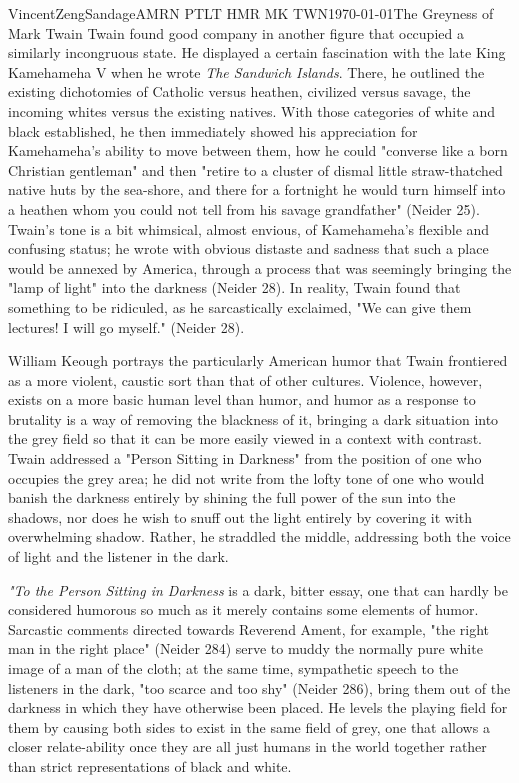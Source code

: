 \documentclass{article}[12pt]
\begin{document}
\begin{mla}{Vincent}{Zeng}{Sandage}{AMRN PTLT HMR MK TWN}{\today}{The Greyness of Mark Twain}
Twain found good company in another figure that occupied a similarly incongruous state. He displayed a certain fascination with the late King Kamehameha V when he wrote \textit{The Sandwich Islands}. There, he outlined the existing dichotomies of Catholic versus heathen, civilized versus savage, the incoming whites versus the existing natives. With those categories of white and black established, he then immediately showed his appreciation for Kamehameha's ability to move between them, how he could "converse like a born Christian gentleman" and then "retire to a cluster of dismal little straw-thatched native huts by the sea-shore, and there for a fortnight he would turn himself into a heathen whom you could not tell from his savage grandfather" (Neider 25). Twain's tone is a bit whimsical, almost envious, of Kamehameha's flexible and confusing status; he wrote with obvious distaste and sadness that such a place would be annexed by America, through a process that was seemingly bringing the "lamp of light" into the darkness (Neider 28). In reality, Twain found that something to be ridiculed, as he sarcastically exclaimed, "We can give them lectures! I will go myself." (Neider 28).

William Keough portrays the particularly American humor that Twain frontiered as a more violent, caustic sort than that of other cultures. Violence, however, exists on a more basic human level than humor, and humor as a response to brutality is a way of removing the blackness of it, bringing a dark situation into the grey field so that it can be more easily viewed in a context with contrast. Twain addressed a "Person Sitting in Darkness" from the position of one who occupies the grey area; he did not write from the lofty tone of one who would banish the darkness entirely by shining the full power of the sun into the shadows, nor does he wish to snuff out the light entirely by covering it with overwhelming shadow. Rather, he straddled the middle, addressing both the voice of light and the listener in the dark.

\textit{"To the Person Sitting in Darkness} is a dark, bitter essay, one that can hardly be considered humorous so much as it merely contains some elements of humor. Sarcastic comments directed towards Reverend Ament, for example, "the right man in the right place" (Neider 284) serve to muddy the normally pure white image of a man of the cloth; at the same time, sympathetic speech to the listeners in the dark, "too scarce and too shy" (Neider 286), bring them out of the darkness in which they have otherwise been placed. He levels the playing field for them by causing both sides to exist in the same field of grey, one that allows a closer relate-ability once they are all just humans in the world together rather than strict representations of black and white.


\end{mla}
\end{document}
